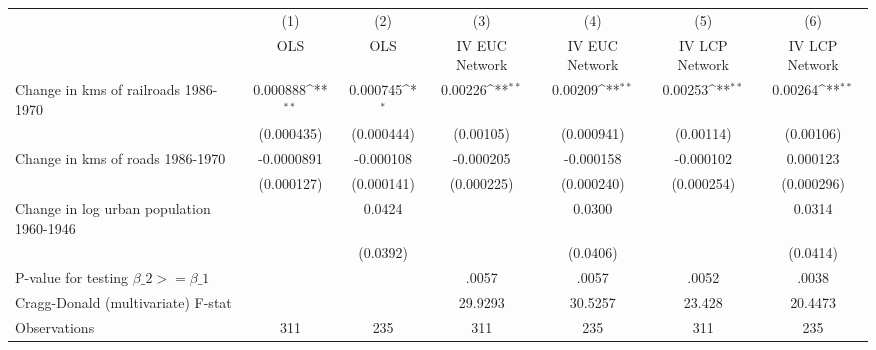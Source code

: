 {
\def\sym#1{\ifmmode^{#1}\else\(^{#1}\)\fi}
\begin{tabular}{l*{6}{c}}
\hline\hline
                &\multicolumn{1}{c}{(1)}&\multicolumn{1}{c}{(2)}&\multicolumn{1}{c}{(3)}&\multicolumn{1}{c}{(4)}&\multicolumn{1}{c}{(5)}&\multicolumn{1}{c}{(6)}\\
                &\multicolumn{1}{c}{OLS}&\multicolumn{1}{c}{OLS}&\multicolumn{1}{c}{IV EUC Network}&\multicolumn{1}{c}{IV EUC Network}&\multicolumn{1}{c}{IV LCP Network}&\multicolumn{1}{c}{IV LCP Network}\\
\hline
Change in kms of railroads 1986-1970& 0.000888\sym{**} & 0.000745\sym{*}  &  0.00226\sym{**} &  0.00209\sym{**} &  0.00253\sym{**} &  0.00264\sym{**} \\
                &(0.000435)         &(0.000444)         &(0.00105)         &(0.000941)         &(0.00114)         &(0.00106)         \\
[1em]
Change in kms of roads 1986-1970&-0.0000891         &-0.000108         &-0.000205         &-0.000158         &-0.000102         & 0.000123         \\
                &(0.000127)         &(0.000141)         &(0.000225)         &(0.000240)         &(0.000254)         &(0.000296)         \\
[1em]
Change in log urban population 1960-1946&                  &   0.0424         &                  &   0.0300         &                  &   0.0314         \\
                &                  & (0.0392)         &                  & (0.0406)         &                  & (0.0414)         \\
\hline
P-value for testing $\beta\_{2} >= \beta\_{1}$&                  &                  &    .0057         &    .0057         &    .0052         &    .0038         \\
Cragg-Donald (multivariate) F-stat&                  &                  &  29.9293         &  30.5257         &   23.428         &  20.4473         \\
Observations    &      311         &      235         &      311         &      235         &      311         &      235         \\
\hline\hline
\end{tabular}
}
